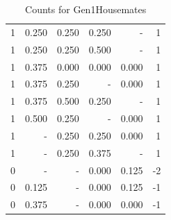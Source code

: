 \documentclass[a4paper]{article}\usepackage{graphicx, color}
\begin{document}
\begin{table}[ht]
\begin{tabular}{rrrrrr}
   \rowcolor{goodColor} 1 & 0.250 & 0.250 & 0.250 & - & 1 \\ 
   \rowcolor{badColor} 1 & 0.250 & 0.250 & 0.500 & - & 1 \\ 
   \rowcolor{goodColor} 1 & 0.375 & 0.000 & 0.000 & 0.000 & 1 \\ 
  1 & 0.375 & 0.250 & - & 0.000 & 1 \\ 
   \rowcolor{badColor} 1 & 0.375 & 0.500 & 0.250 & - & 1 \\ 
  1 & 0.500 & 0.250 & - & 0.000 & 1 \\ 
   \rowcolor{goodColor} 1 & - & 0.250 & 0.250 & 0.000 & 1 \\ 
  1 & - & 0.250 & 0.375 & - & 1 \\ 
   \rowcolor{sosoColor} 0 & - & - & 0.000 & 0.125 & -2 \\ 
   \rowcolor{sosoColor} 0 & 0.125 & - & 0.000 & 0.125 & -1 \\ 
   \rowcolor{sosoColor} 0 & 0.375 & - & 0.000 & 0.000 & -1 \\ 
   \hline
\end{tabular}
\caption{Counts for Gen1Housemates} 
\end{table}
\end{document}
